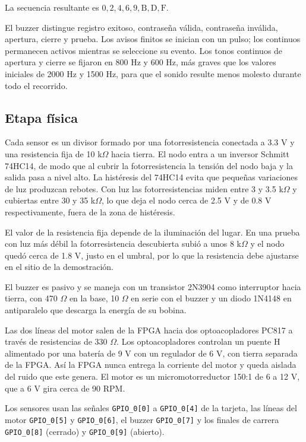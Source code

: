 \documentclass[12pt,letterpaper]{article}
\begin{document}
La secuencia resultante es
$0,2,4,6,9,\mathrm{B},\mathrm{D},\mathrm{F}$.

El buzzer distingue registro exitoso, contraseña válida,
contraseña inválida, apertura, cierre y prueba. Los
avisos finitos se inician con un pulso; los continuos
permanecen activos mientras se seleccione su evento.
Los tonos continuos de apertura y cierre se fijaron en
800 Hz y 600 Hz, más graves que los valores iniciales
de 2000 Hz y 1500 Hz, para que el sonido resulte menos
molesto durante todo el recorrido.

\subsection{Etapa física}

Cada sensor es un divisor formado por una fotorresistencia
conectada a 3.3 V y una resistencia fija de
10 k$\Omega$ hacia tierra. El nodo entra a un inversor
Schmitt 74HC14, de modo que al cubrir la fotorresistencia
la tensión del nodo baja y la salida pasa a nivel alto.
La histéresis del 74HC14 evita que pequeñas variaciones
de luz produzcan rebotes. Con luz las fotorresistencias
miden entre 3 y 3.5 k$\Omega$ y cubiertas entre 30 y
35 k$\Omega$, lo que deja el nodo cerca de 2.5 V y de
0.8 V respectivamente, fuera de la zona de histéresis.

El valor de la resistencia fija depende de la iluminación
del lugar. En una prueba con luz más débil la
fotorresistencia descubierta subió a unos 8 k$\Omega$
y el nodo quedó cerca de 1.8 V, justo en el umbral, por
lo que la resistencia debe ajustarse en el sitio de la
demostración.

El buzzer es pasivo y se maneja con un transistor 2N3904
como interruptor hacia tierra, con 470 $\Omega$ en la
base, 10 $\Omega$ en serie con el buzzer y un diodo
1N4148 en antiparalelo que descarga la energía de su
bobina.

Las dos líneas del motor salen de la FPGA hacia dos
optoacopladores PC817 a través de resistencias de
330 $\Omega$. Los optoacopladores controlan un puente H
alimentado por una batería de 9 V con un regulador de
6 V, con tierra separada de la FPGA. Así la FPGA nunca
entrega la corriente del motor y queda aislada del ruido
que este genera. El motor es un micromotorreductor 150:1
de 6 a 12 V, que a 6 V gira cerca de 90 RPM.

Los sensores usan las señales \texttt{GPIO\_0[0]} a
\texttt{GPIO\_0[4]} de la tarjeta, las líneas del motor
\texttt{GPIO\_0[5]} y \texttt{GPIO\_0[6]}, el buzzer
\texttt{GPIO\_0[7]} y los finales de carrera
\texttt{GPIO\_0[8]} (cerrado) y \texttt{GPIO\_0[9]}
(abierto).
\end{document}
